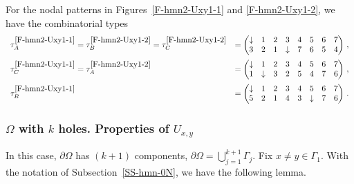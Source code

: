 \documentclass[12pt,a4paper]{amsart}
\theoremstyle{plain} %
\theoremstyle{definition}
\numberwithin{equation}{section}
\numberwithin{figure}{section}
\numberwithin{table}{section}
\begin{document}
{For the nodal patterns in Figures~\ref{F-hmn2-Uxy1-1} and  \ref{F-hmn2-Uxy1-2}, we have the  combinatorial types
%
\begin{equation*}
\begin{array}{ll}
\tau^{\ref{F-hmn2-Uxy1-1}}_A = \tau^{\ref{F-hmn2-Uxy1-2}}_B = \tau^{\ref{F-hmn2-Uxy1-2}}_C &= \begin{pmatrix}
                         \downarrow & 1 & 2 & 3 & 4 & 5 & 6 & 7 \\
                          3 & 2 & 1 & \downarrow & 7 & 6 & 5 & 4 \\
                        \end{pmatrix}\,,\\[12pt]
\tau^{\ref{F-hmn2-Uxy1-1}}_C = \tau^{\ref{F-hmn2-Uxy1-2}}_A &= \begin{pmatrix}
                         \downarrow & 1 & 2 & 3 & 4 & 5 & 6 & 7 \\
                          1 & \downarrow  & 3 & 2 & 5 & 4 & 7 & 6 \\
\end{pmatrix}\,,\\[12pt]
                        \tau^{\ref{F-hmn2-Uxy1-1}}_B &= \begin{pmatrix}
                        \downarrow & 1 & 2 & 3 & 4 & 5 & 6 & 7 \\
                        5 & 2 & 1 & 4 & 3 & \downarrow & 7 & 6 \\
                        \end{pmatrix}\,.
\end{array}%
\end{equation*}


\subsubsection{ $\Omega$ with $k$ holes. Properties of $U_{x,y}$}\label{SSS-hmn-21d}


In this case, $\partial \Omega$ has $(k+1)$ components,  $\partial \Omega = \bigcup_{j=1}^{k+1} \Gamma_j$. Fix $x \not = y \in \Gamma_1$.
With the notation of Subsection~\ref{SS-hmn-0N}, we have the following lemma.

}
\end{document}

